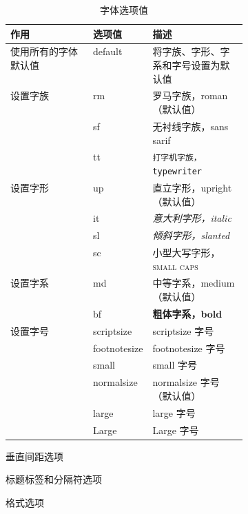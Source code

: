 \begin{table}
\centering
\caption{ 字体选项值}\label{tab:caption-fontval}
\begin{tabular}{l>{\ttfamily}lp{0.4\linewidth}}
\toprule
作用 & {\rm 选项值} & 描述 \\
\midrule
使用所有的字体默认值 & default & 将字族、字形、字系和字号设置为默认值 \\
\midrule
设置字族 & rm & \textrm{罗马字族，roman}（默认值） \\
& sf & \textsf{无衬线字族，sans sarif} \\
& tt & \texttt{打字机字族，typewriter} \\
\midrule
设置字形 & up & \textup{直立字形，upright} （默认值） \\
& it & \textit{意大利字形，italic} \\
& sl & \textsl{倾斜字形，slanted} \\
& sc & \textsc{小型大写字形，small caps} \\
\midrule
设置字系 & md & \textmd{中等字系，medium} （默认值） \\
& bf & \textbf{粗体字系，bold} \\
\midrule
设置字号 & scriptsize & {\scriptsize scriptsize 字号} \\
& footnotesize & {\footnotesize footnotesize 字号} \\
& small & {\small small 字号} \\
& normalsize & {\normalsize normalsize 字号} （默认值） \\
& large & {\large large 字号} \\
& Large & {\Large Large 字号}\\
\bottomrule
\end{tabular}
\end{table}

\begin{table}
\centering
\caption{ 垂直间距选项}\label{tab:caption-spaceopt}
\end{table}


\begin{table}
\centering
\caption{ 标题标签和分隔符选项}\label{tab:caption-labelopt}
\end{table}

\begin{table}
\centering
\caption{ 格式选项}\label{tab:caption-formatopt}
\end{table}


